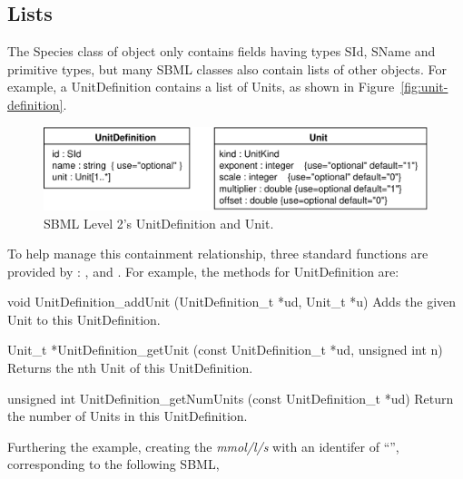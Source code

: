 \documentclass{sbmlmanual}
\begin{document}
\subsection{Lists}
\label{sec:lists}

The Species class of object only contains fields having types SId, SName
and primitive types, but many SBML classes also contain lists of other
objects.  For example, a UnitDefinition contains a list of Units, as shown
in Figure~\vref{fig:unit-definition}.

\begin{figure}[htb]
  \centering
  \includegraphics[scale=0.68]{graphics/unitdefinition}
  \caption{SBML Level 2's UnitDefinition and Unit.}
  \label{fig:unit-definition}
\end{figure}

To help manage this containment relationship, three standard functions are
provided by \libsbml{}: ,  and
.  For example, the methods for UnitDefinition
are:


\begin{methoddef}{void UnitDefinition\_addUnit (UnitDefinition\_t *ud,
Unit\_t *u)}
  Adds the given Unit to this UnitDefinition.
\end{methoddef}

\begin{methoddef}{Unit\_t *UnitDefinition\_getUnit (const UnitDefinition\_t
*ud, unsigned int n)}
Returns the nth Unit of this UnitDefinition.
\end{methoddef}

\begin{methoddef}{unsigned int UnitDefinition\_getNumUnits (const
UnitDefinition\_t *ud)}
  Return the number of Units in this UnitDefinition.
\end{methoddef}


Furthering the example, creating the  \emph{mmol/l/s}
with an identifer of ``'', corresponding to the following SBML,
\end{document}
